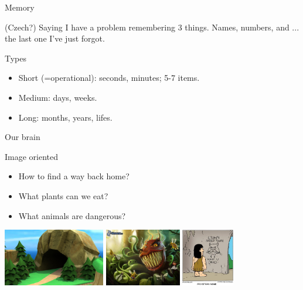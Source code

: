 
\begin{frame}{Memory}
  \begin{block}{(Czech?) Saying}
    I have a problem remembering 3 things. Names, numbers, and ... the last one I've just forgot. 
  \end{block}
  \begin{block}{Types}
    \begin{itemize}
      \item Short (=operational): seconds, minutes; 5-7 items. 
      \item Medium: days, weeks. 
      \item Long: months, years, lifes. 
    \end{itemize}
  \end{block}
\end{frame}

\begin{frame}{Our brain}
  \begin{block}{Image oriented}
    \begin{itemize}
      \item How to find a way back home?
      \item What plants can we eat? 
      \item What animals are dangerous? 
    \end{itemize}
  \end{block}
  \begin{center}
    \includegraphics[height=2.5cm]{img/cave.jpg}
    \includegraphics[height=2.5cm]{img/plant.jpg}
    \includegraphics[height=2.5cm]{img/animal.jpg}
  \end{center}
\end{frame}

